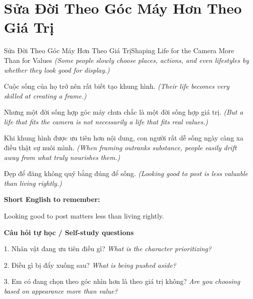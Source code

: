 \section{Sửa Đời Theo Góc Máy Hơn Theo Giá Trị}
\begin{truyen}{Sửa Đời Theo Góc Máy Hơn Theo Giá Trị}{Shaping Life for the Camera More Than for Values}
\textit{(Some people slowly choose places, actions, and even lifestyles by whether they look good for display.)}

Cuộc sống của họ trở nên rất biết tạo khung hình.
\textit{(Their life becomes very skilled at creating a frame.)}

Nhưng một đời sống hợp góc máy chưa chắc là một đời sống hợp giá trị.
\textit{(But a life that fits the camera is not necessarily a life that fits real values.)}

Khi khung hình được ưu tiên hơn nội dung, con người rất dễ sống ngày càng xa điều thật sự nuôi mình.
\textit{(When framing outranks substance, people easily drift away from what truly nourishes them.)}

\end{truyen}

\begin{baihoc}
Đẹp để đăng không quý bằng đúng để sống.
\textit{(Looking good to post is less valuable than living rightly.)}
\end{baihoc}

\begin{ghinhoanh}
\textbf{Short English to remember:}

Looking good to post matters less than living rightly.

\end{ghinhoanh}

\begin{tuhocnhanh}
\textbf{Câu hỏi tự học / Self-study questions}

1. Nhân vật đang ưu tiên điều gì? \textit{What is the character prioritizing?}

2. Điều gì bị đẩy xuống sau? \textit{What is being pushed aside?}

3. Em có đang chọn theo góc nhìn hơn là theo giá trị không? \textit{Are you choosing based on appearance more than value?}
\end{tuhocnhanh}
\ngancach


